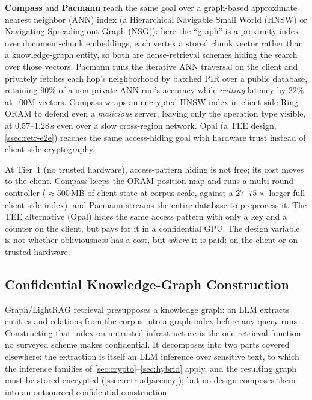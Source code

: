 \textbf{Compass} and \textbf{Pacmann} reach the same goal over a graph-based approximate nearest
neighbor (ANN) index (a Hierarchical Navigable Small World (HNSW) or Navigating Spreading-out Graph
(NSG)): here the ``graph'' is a proximity index over document-chunk embeddings, each vertex a stored
chunk vector rather than a knowledge-graph entity, so both are dense-retrieval schemes hiding the
search over those vectors. Pacmann runs
the iterative ANN traversal on the client and privately fetches each hop's neighborhood by batched
PIR over a public database, retaining $90\%$ of a non-private ANN run's accuracy while
\emph{cutting} latency by $22\%$ at $100$M vectors. Compass wraps an encrypted HNSW index in
client-side Ring-ORAM to defend even a \emph{malicious} server, leaving only the operation type
visible, at $0.57$--$1.28$\,s even over a slow cross-region network. Opal (a TEE design, \cref{ssec:retr-e2e}) reaches the same
access-hiding goal with hardware trust instead of client-side cryptography.

\begin{keyinsight}
At Tier~1 (no trusted hardware), access-pattern hiding is not free; its cost moves to the
client. Compass keeps the ORAM position map and runs a multi-round controller ($\approx$500\,MB of
client state at corpus scale, against a $27$--$75\times$ larger full client-side index), and
Pacmann streams the entire database to preprocess it. The TEE alternative (Opal) hides the same
access pattern with only a key and a counter on the client, but pays for it in a confidential
GPU. The design variable is not whether obliviousness has a cost, but \emph{where} it is paid: on the
client or on trusted hardware.
\end{keyinsight}

\subsection{Confidential Knowledge-Graph Construction}
\label{ssec:retr-kgconstruct}
Graph/LightRAG retrieval presupposes a knowledge graph: an LLM extracts entities and relations
from the corpus into a graph index before any query runs~\citep{guo_lightrag}. Constructing that index on untrusted
infrastructure is the one retrieval function no surveyed scheme makes confidential. It decomposes into two
parts covered elsewhere: the extraction is itself an LLM inference over sensitive text, to which
the inference families of \cref{sec:crypto}--\cref{sec:hybrid} apply, and the resulting graph must
be stored encrypted (\cref{ssec:retr-adjacency}); but no design composes them into an outsourced
confidential construction.

